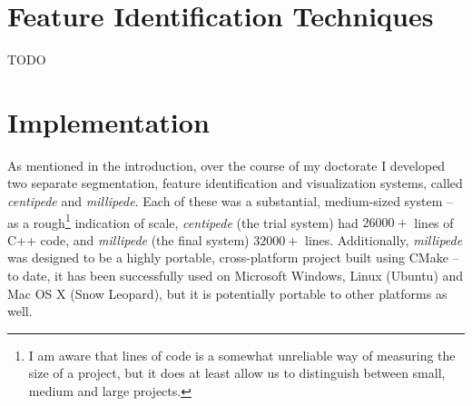 \section{Feature Identification Techniques}

TODO

\iffalse
+ The feature identifiers are relatively quick to run
+ The 2D ribs identifier is relatively effective, although it can miss ribs in some cases
+ The 2D spine identifier is effective and robust (about 85%
+ The 3D spine identifier is relatively effective and robust, but has a tendency to flood into the ribs a bit
+ The 3D spinal cord identifier is relatively effective and robust, although the contour of the spinal cord is by no means perfect yet
+ The 3D kidneys identifier is a reasonable start, but requires further work both to make it more robust and to detect kidneys that are made up of multiple regions 
- Because the current techniques are based on region growing, they suffer from the usual sort of region growing problems; a better approach might be to use the partition forest to find initial features, and then use level sets
- The 3D aorta identifier only works well when the segmentation is particularly good; it needs further work
- The 3D liver identifier is not ideal (although it does start out in the right place), and has a tendency to flood into other features
\fi

\section{Implementation}

As mentioned in the introduction, over the course of my doctorate I developed two separate segmentation, feature identification and visualization systems, called \emph{centipede} and \emph{millipede}. Each of these was a substantial, medium-sized system -- as a rough\footnote{I am aware that lines of code is a somewhat unreliable way of measuring the size of a project, but it does at least allow us to distinguish between small, medium and large projects.} indication of scale, \emph{centipede} (the trial system) had $26000+$ lines of C++ code, and \emph{millipede} (the final system) $32000+$ lines. Additionally, \emph{millipede} was designed to be a highly portable, cross-platform project built using CMake -- to date, it has been successfully used on Microsoft Windows, Linux (Ubuntu) and Mac OS X (Snow Leopard), but it is potentially portable to other platforms as well.

